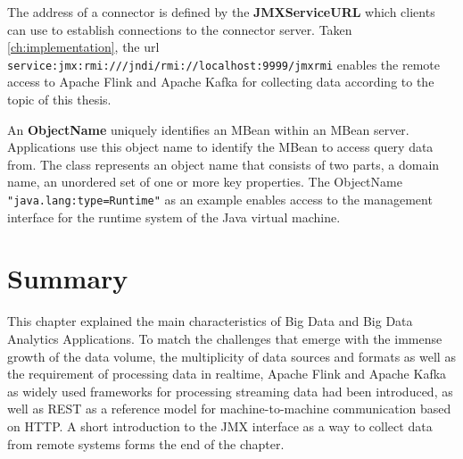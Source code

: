 The address of a connector is defined by the \textbf{JMXServiceURL} which clients can use to establish connections
to the connector server. Taken \autoref{ch:implementation}, the url \verb|service:jmx:rmi:///jndi/rmi://localhost:9999/jmxrmi|
enables the remote access to Apache Flink and Apache Kafka for collecting data according to the topic of this thesis.

An \textbf{ObjectName} uniquely identifies an MBean within an MBean server. Applications use this object name to identify
the MBean to access query data from. The class represents an object name that consists of two parts,
a domain name, an unordered set of one or more key properties. The ObjectName \verb|"java.lang:type=Runtime"|
as an example enables access to the management interface for the runtime system of the Java virtual machine.

\section{Summary}

This chapter explained the main characteristics of Big Data and Big Data Analytics Applications.
To match the challenges that emerge with the immense growth of the data volume, the multiplicity of data sources and
formats as well as the requirement of processing data in realtime, Apache Flink and Apache Kafka as widely used
frameworks for processing streaming data had been introduced, as well as REST as a reference model for machine-to-machine communication
based on HTTP.  A short introduction to the JMX interface as a way to collect data from remote systems forms the end of the chapter.

